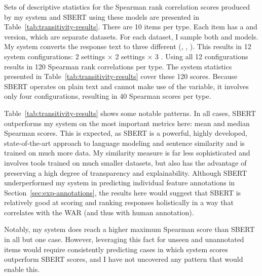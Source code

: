 Sets of descriptive statistics for the Spearman rank correlation scores produced by my system and SBERT using these models are presented in Table~\ref{tab:transitivity-results}. There are 10 items per type. Each item has a  and  version, which are separate datasets. For each dataset, I sample both  and  models. My system converts the response text to three different  (, , ). This results in 12 system configurations: 2  settings $\times$ 2  settings $\times$ 3 . Using all 12 configurations results in 120 Spearman rank correlations per  type. The system statistics presented in Table~\ref{tab:transitivity-results} cover these 120 scores. Because SBERT operates on plain text and cannot make use of the  variable, it involves only four configurations, resulting in 40 Spearman scores per  type.

Table~\ref{tab:transitivity-results} shows some notable patterns. In all cases, SBERT outperforms my system on the most important metrics here: mean and median Spearman scores. This is expected, as SBERT is a powerful, highly developed, state-of-the-art approach to language modeling and sentence similarity and is trained on much more data. My similarity measure is far less sophisticated and involves tools trained on much smaller datasets, but also has the advantage of preserving a high degree of transparency and explainability. Although SBERT underperformed my system in predicting individual feature annotations in Section~\ref{sec:exp-annotations}, the results here would suggest that SBERT is relatively good at scoring and ranking responses holistically in a way that correlates with the WAR (and thus with human annotation).

Notably, my system does reach a higher maximum Spearman score than SBERT in all but one case. However, leveraging this fact for unseen and unannotated items would require consistently predicting cases in which system scores outperform SBERT scores, and I have not uncovered any pattern that would enable this.

